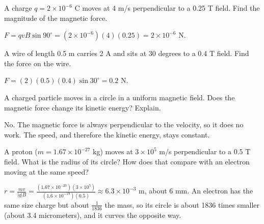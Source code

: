 \begin{Exercise}[label=mag2, title=Force on a charge]
A charge $q = 2 \times 10^{-6}$ C moves at 4 m/s perpendicular to a 0.25 T field. Find the magnitude of the magnetic force.
\end{Exercise}
\begin{Answer}[ref=mag2]
$F = qvB\sin 90^\circ = (2 \times 10^{-6})(4)(0.25) = 2 \times 10^{-6}$ N.
\end{Answer}

\begin{Exercise}[label=mag3, title=Force on a wire]
A wire of length 0.5 m carries 2 A and sits at 30 degrees to a 0.4 T field. Find the force on the wire.
\end{Exercise}
\begin{Answer}[ref=mag3]
$F = (2)(0.5)(0.4)\sin 30^\circ = 0.2$ N.
\end{Answer}

\begin{Exercise}[label=mag4, title=Does the field do work?]
A charged particle moves in a circle in a uniform magnetic field. Does the magnetic force change its kinetic energy? Explain.
\end{Exercise}
\begin{Answer}[ref=mag4]
No. The magnetic force is always perpendicular to the velocity, so it does no work. The speed, and therefore the kinetic energy, stays constant.
\end{Answer}

\begin{Exercise}[label=mag5, title=Proton in a circle]
A proton ($m = 1.67 \times 10^{-27}$ kg) moves at $3 \times 10^5$ m/s
perpendicular to a 0.5 T field. What is the radius of its circle? How
does that compare with an electron moving at the same speed?
\end{Exercise}
\begin{Answer}[ref=mag5]
$r = \frac{mv}{|q|B} = \frac{(1.67 \times 10^{-27})(3 \times 10^5)}{(1.6 \times 10^{-19})(0.5)} \approx 6.3 \times 10^{-3}$ m, about 6 mm.
An electron has the same size charge but about $\frac{1}{1836}$ the mass,
so its circle is about 1836 times smaller (about 3.4 micrometers), and it
curves the opposite way.
\end{Answer}
